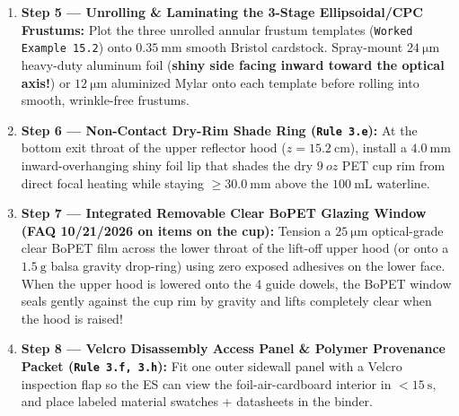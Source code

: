 \begin{enumerate}
  \item \textbf{Step 5 --- Unrolling \& Laminating the 3-Stage Ellipsoidal/CPC Frustums:} Plot the three unrolled annular frustum templates (\texttt{Worked Example 15.2}) onto $\SI{0.35}{\milli\meter}$ smooth Bristol cardstock. Spray-mount $\SI{24}{\micro\meter}$ heavy-duty aluminum foil (\textbf{shiny side facing inward toward the optical axis!}) or $\SI{12}{\micro\meter}$ aluminized Mylar onto each template before rolling into smooth, wrinkle-free frustums.
  \item \textbf{Step 6 --- Non-Contact Dry-Rim Shade Ring (\texttt{Rule 3.e}):} At the bottom exit throat of the upper reflector hood ($z = \SI{15.2}{\centi\meter}$), install a $\SI{4.0}{\milli\meter}$ inward-overhanging shiny foil lip that shades the dry $\SI{9}{oz}$ PET cup rim from direct focal heating while staying $\ge \SI{30.0}{\milli\meter}$ above the $\SI{100}{\milli\liter}$ waterline.
  \item \textbf{Step 7 --- Integrated Removable Clear BoPET Glazing Window (FAQ 10/21/2026 on items on the cup):} Tension a $\SI{25}{\micro\meter}$ optical-grade clear BoPET film across the lower throat of the lift-off upper hood (or onto a $\SI{1.5}{\gram}$ balsa gravity drop-ring) using zero exposed adhesives on the lower face. When the upper hood is lowered onto the 4 guide dowels, the BoPET window seals gently against the cup rim by gravity and lifts completely clear when the hood is raised!
  \item \textbf{Step 8 --- Velcro Disassembly Access Panel \& Polymer Provenance Packet (\texttt{Rule 3.f, 3.h}):} Fit one outer sidewall panel with a Velcro inspection flap so the ES can view the foil-air-cardboard interior in $<\SI{15}{\second}$, and place labeled material swatches + datasheets in the binder.
\end{enumerate}

